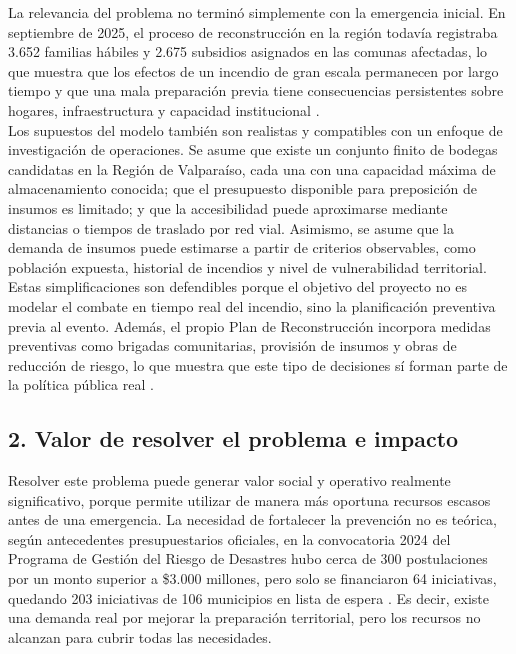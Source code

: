 \documentclass[letterpaper]{article}
\begin{document}
\begin{flushleft}
La relevancia del problema no termin\'o simplemente con la emergencia inicial. En septiembre de 2025, el proceso de reconstrucci\'on en la regi\'on todav\'ia registraba 3.652 familias h\'abiles y 2.675 subsidios asignados en las comunas afectadas, lo que muestra que los efectos de un incendio de gran escala permanecen por largo tiempo y que una mala preparaci\'on previa tiene consecuencias persistentes sobre hogares, infraestructura y capacidad institucional \cite{Minvu2025}.\\

Los supuestos del modelo tambi\'en son realistas y compatibles con un enfoque de investigaci\'on de operaciones. Se asume que existe un conjunto finito de bodegas candidatas en la Regi\'on de Valpara\'iso, cada una con una capacidad m\'axima de almacenamiento conocida; que el presupuesto disponible para preposici\'on de insumos es limitado; y que la accesibilidad puede aproximarse mediante distancias o tiempos de traslado por red vial. Asimismo, se asume que la demanda de insumos puede estimarse a partir de criterios observables, como poblaci\'on expuesta, historial de incendios y nivel de vulnerabilidad territorial. Estas simplificaciones son defendibles porque el objetivo del proyecto no es modelar el combate en tiempo real del incendio, sino la planificaci\'on preventiva previa al evento. Adem\'as, el propio Plan de Reconstrucci\'on incorpora medidas preventivas como brigadas comunitarias, provisi\'on de insumos y obras de reducci\'on de riesgo, lo que muestra que este tipo de decisiones s\'i forman parte de la pol\'itica p\'ublica real \cite{MinDesarrollo2024-2}.

\subsection{2. Valor de resolver el problema e impacto}
Resolver este problema puede generar valor social y operativo realmente significativo, porque permite utilizar de manera m\'as oportuna recursos escasos antes de una emergencia. La necesidad de fortalecer la prevenci\'on no es te\'orica, seg\'un antecedentes presupuestarios oficiales, en la convocatoria 2024 del Programa de Gesti\'on del Riesgo de Desastres hubo cerca de 300 postulaciones por un monto superior a \$3.000 millones, pero solo se financiaron 64 iniciativas, quedando 203 iniciativas de 106 municipios en lista de espera \cite{Dipres2025}. Es decir, existe una demanda real por mejorar la preparaci\'on territorial, pero los recursos no alcanzan para cubrir todas las necesidades.\\


\end{flushleft}
\end{document}
